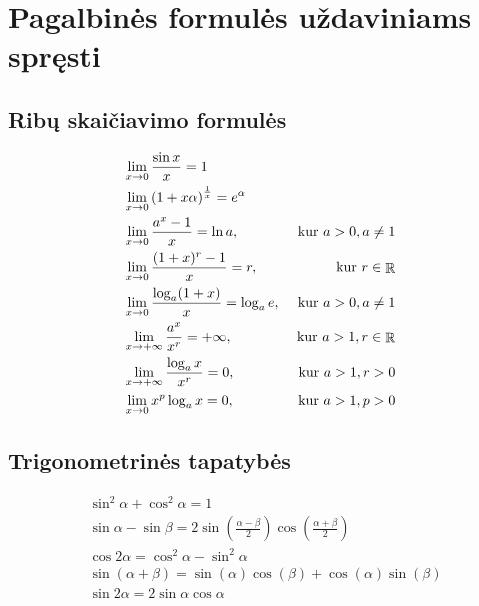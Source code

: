 \appendix
\chapter{Pagalbinės formulės uždaviniams spręsti}

\section{Ribų skaičiavimo formulės}

\begin{align} 
%
  &\lim _{x \to 0} \frac{\sin x}{x} = 1
  \label{f_lim_sin} \\
%
  &\lim _{x \to 0} \left( 1 + x \alpha \right)^{\frac{1}{x}} = e^{\alpha}
  \label{f_lim_exp} \\
%
  &\lim _{x \to 0} \frac{a^x - 1}{x} = \ln a, 
  & \text{ kur } a > 0, a \neq 1
  \label{f_lim_ep} \\
% 
  &\lim _{x \to 0} \frac{(1 + x)^r -1}{x} = r, & \text{ kur } r \in \RSET
  \label{f_lim_lp} \\
%
  &\lim _{x \to 0} \frac{\log _{a} (1 + x)}{x} = \log _{a} e, 
  & \text{ kur } a > 0, a \neq 1
  \label{f_lim_log} \\
%
  &\lim _{x \to +\infty} \frac{a^x}{x^r} = +\infty, 
  & \text{ kur } a > 1, r \in \RSET
  \label{f_lim_rl} \\
% 
  &\lim _{x \to +\infty} \frac{\log _{a} x}{x^r} = 0,
  & \text{ kur } a > 1, r > 0
  \label{f_lim_llb} \\
%
  &\lim _{x \to 0} x^p \log _{a} x = 0, & \text{ kur } a > 1, p > 0
  \label{f_lim_lln}
%
\end{align}

\section{Trigonometrinės tapatybės}

\begin{align}
%
  & \sin ^{2} \alpha + \cos ^{2} \alpha = 1
  \label{f_tri_kvsum} \\
%
  & \sin \alpha - \sin \beta = 2 
    \sin \left( \frac{\alpha - \beta}{2} \right)
    \cos \left( \frac{\alpha + \beta}{2} \right)
  \label{f_tri_sinsk} \\
%
  & \cos 2 \alpha = \cos ^{2} \alpha - \sin ^{2} \alpha
  \label{f_tri_dkcos} \\
%
  & \sin (\alpha + \beta) = 
  \sin (\alpha) \cos (\beta) + \cos(\alpha) \sin(\beta) 
  \label{f_tri_sin} \\
  & \sin 2 \alpha = 2 \sin \alpha \cos \alpha
  \label{f_tri_dksin} 
%
\end{align}

